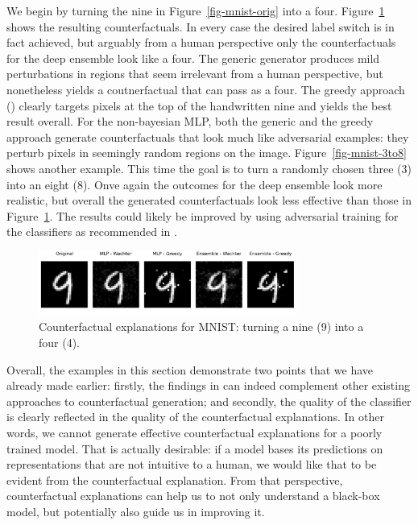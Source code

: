 \documentclass{juliacon}
\begin{document}
We begin by turning the nine in Figure~\ref{fig-mnist-orig} into a four.
Figure~\ref{fig-mnist-9to4} shows the resulting counterfactuals. In
every case the desired label switch is in fact achieved, but arguably
from a human perspective only the counterfactuals for the deep ensemble
look like a four. The generic generator produces mild perturbations in
regions that seem irrelevant from a human perspective, but nonetheless
yields a coutnerfactual that can pass as a four. The greedy approach
(\cite{schut2021generating}) clearly targets pixels at the top of the
handwritten nine and yields the best result overall. For the
non-bayesian MLP, both the generic and the greedy approach generate
counterfactuals that look much like adversarial examples: they perturb
pixels in seemingly random regions on the image.
Figure~\ref{fig-mnist-3to8} shows another example. This time the goal is
to turn a randomly chosen three (3) into an eight (8). Onve again the
outcomes for the deep ensemble look more realistic, but overall the
generated counterfactuals look less effective than those in
Figure~\ref{fig-mnist-9to4}. The results could likely be improved by
using adversarial training for the classifiers as recommended in
\cite{schut2021generating}.

\begin{figure}

{\centering \includegraphics[width=3.33333in,height=0.83333in]{www/mnist_9_to_4.png}

}

\caption{\label{fig-mnist-9to4}Counterfactual explanations for MNIST:
turning a nine (9) into a four (4).}

\end{figure}

Overall, the examples in this section demonstrate two points that we
have already made earlier: firstly, the findings in
\cite{schut2021generating} can indeed complement other existing
approaches to counterfactual generation; and secondly, the quality of
the classifier is clearly reflected in the quality of the counterfactual
explanations. In other words, we cannot generate effective
counterfactual explanations for a poorly trained model. That is actually
desirable: if a model bases its predictions on representations that are
not intuitive to a human, we would like that to be evident from the
counterfactual explanation. From that perspective, counterfactual
explanations can help us to not only understand a black-box model, but
potentially also guide us in improving it.
\end{document}
